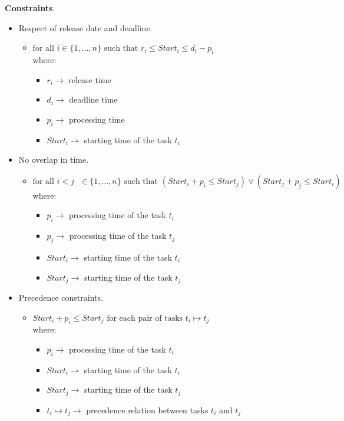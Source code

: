 \begin{example}
    \textbf{Constraints}.
    \begin{itemize}
        \renewcommand{\labelitemi}{-}
        \item Respect of release date and deadline. 
        \begin{itemize}
            \item $\text{for all } i \in \{1, \dots, n\} \text{ such that } r_i \leq Start_i \leq d_i - p_i$ \\
            where: 
            \begin{itemize}
                \item $r_i \rightarrow$ release time
                \item $d_i \rightarrow$ deadline time
                \item $p_i \rightarrow$ processing time
                \item $Start_i \rightarrow$ starting time of the task $t_i$
            \end{itemize}
        \end{itemize}
        \item No overlap in time. 
        \begin{itemize}
            \item $\text{for all } i < j \text{ } \in \{1, \dots, n\} \text{ such that } (Start_i + p_i \leq Start_j) \vee (Start_j + p_j \leq Start_i)$ \\
            where:
            \begin{itemize}
                \item $p_i \rightarrow$ processing time of the task $t_i$
                \item $p_j \rightarrow$ processing time of the task $t_j$
                \item $Start_i \rightarrow$ starting time of the task $t_i$
                \item $Start_j \rightarrow$ starting time of the task $t_j$
            \end{itemize}
        \end{itemize}
        \item Precedence constraints. 
        \begin{itemize}
            \item $Start_i + p_i \leq Start_j \text{ for each pair of tasks } t_i \mapsto t_j$ \\
            where:
            \begin{itemize}
                \item $p_i \rightarrow$ processing time of the task $t_i$
                \item $Start_i \rightarrow$ starting time of the task $t_i$
                \item $Start_j \rightarrow$ starting time of the task $t_j$
                \item $t_i \mapsto t_j \rightarrow$ precedence relation between tasks $t_i$ and $t_j$
            \end{itemize}
        \end{itemize}
    \end{itemize} \vspace{7pt}


\end{example}
